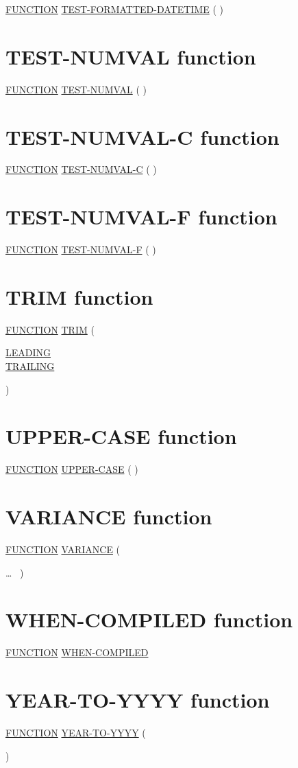 \documentclass[a4paper,oneside,svgnames]{scrbook}
\makeatletter
\newcommand{\key}[1]{\underline{#1}}
\newenvironment{0-1}{$\left[ \begin{tabular}{@{}l@{}}}{\end{tabular} \right]$}
\newenvironment{1=}{$\left\{ \begin{tabular}{@{}l@{}}}{\end{tabular} \right\}$}
\makeatother
\begin{document}
\key{FUNCTION} \key{TEST-FORMATTED-DATETIME} ( \argument \argument )

\section{TEST-NUMVAL function}

\key{FUNCTION} \key{TEST-NUMVAL} ( \argument )

\section{TEST-NUMVAL-C function}

\key{FUNCTION} \key{TEST-NUMVAL-C} ( \argument \argument )

\section{TEST-NUMVAL-F function}

\key{FUNCTION} \key{TEST-NUMVAL-F} ( \argument )

\section{TRIM function}

\key{FUNCTION} \key{TRIM} ( \argument
\begin{0-1}
  \key{LEADING} \\
  \key{TRAILING}
\end{0-1}
)

\section{UPPER-CASE function}

\key{FUNCTION} \key{UPPER-CASE} ( \argument )

\section{VARIANCE function}

\key{FUNCTION} \key{VARIANCE} (
\begin{1=}
  \argument
\end{1=}\ldots
\ {})

\section{WHEN-COMPILED function}

\key{FUNCTION} \key{WHEN-COMPILED}

\section{YEAR-TO-YYYY function}

\key{FUNCTION} \key{YEAR-TO-YYYY} ( \argument
\begin{0-1}
  \argument
  \begin{0-1}
    \argument
  \end{0-1}
\end{0-1}
)

\begin{appendices}

  
\end{appendices}
\end{document}
